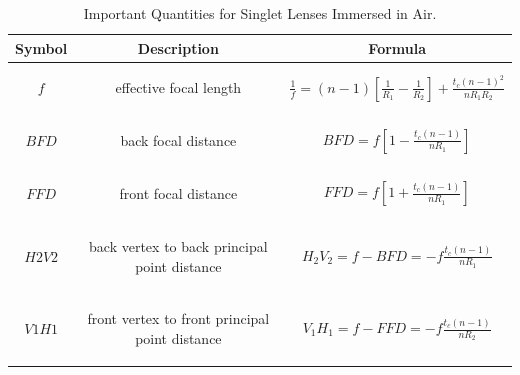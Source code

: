 \begin{table}
\centering
\caption{Important Quantities for Singlet Lenses Immersed in Air\cite{lens_theory_LC_Ltd}.}
\begin{tabular}{|c|c|c|}
\hline
\textbf{Symbol}&\textbf{Description}&\textbf{Formula}\\
\hline
$f$ & \parbox[c]{6cm}{
						\begin{center}
						effective focal length
						\end{center}
				}& $\frac{1}{f}=(n-1)\left[\frac{1}{R_{1}}-\frac{1}{R_{2}} \right]+\frac{t_{c}(n-1)^2}{nR_{1}R_{2}}$ \\
\hline
$BFD$ &\parbox[c]{6cm}{
						\begin{center}
						back focal distance 
						\end{center}
			}& $BFD=f\left[ 1-\frac{t_{c}(n-1)}{nR_{1}}\right]$ \\
\hline
$FFD$ &\parbox[c]{6cm}{
						\begin{center}
						 front focal distance
						 \end{center} 
			}& $FFD=f\left[ 1+\frac{t_{c}(n-1)}{nR_{1}}\right]$ \\
\hline
$H2V2$ & \parbox[c]{6cm}{
						\begin{center}
						back vertex to back principal point distance
						\end{center}						
			} & $H_{2}V_{2}=f-BFD=-f\frac{t_{c}(n-1)}{nR_{1}}$ \\
\hline
$V1H1$ & \parbox[c]{6cm}{
						\begin{center}			
				    front vertex to front principal point distance
				    \end{center}
				 } & $V_{1}H_{1}=f-FFD=-f\frac{t_{c}(n-1)}{nR_{2}}$ \\
\hline
\end{tabular}
\label{tab:lens_quantities}
\end{table}


